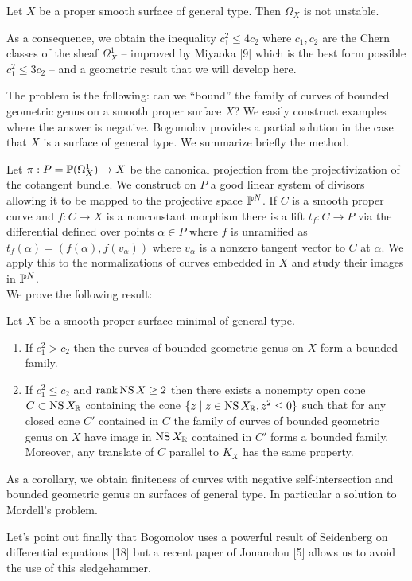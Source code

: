 \documentclass[main.tex]{subfiles}
\begin{document}
\begin{theorem}[0.3]
Let $X$ be a proper smooth surface of general type. Then $\Omega_X$ is not unstable.
\end{theorem}

As a consequence, we obtain the inequality $c_1^2 \le 4 c_2$ where $c_1, c_2$ are the Chern classes of the sheaf $\Omega_X^1$ -- improved by Miyaoka [9] which is the best form possible $c_1^2 \le 3 c_2$ -- and a geometric result that we will develop here.
\par
The problem is the following: can we ``bound'' the family of curves of bounded geometric genus on a smooth proper surface $X$? We easily construct examples where the answer is negative. Bogomolov provides a partial solution in the case that $X$ is a surface of general type. We summarize briefly the method.
\par
Let $\pi : P = \P(\Omega_X^1) \to X$ be the canonical projection from the projectivization of the cotangent bundle. We construct on $P$ a good linear system of divisors allowing it to be mapped to the projective space $\P^N$. If $C$ is a smooth proper curve and $f: C \to X$ is a nonconstant morphism there is a lift $t_f : C \to P$ via the differential defined over points $\alpha \in P$ where $f$ is unramified as $t_f(\alpha) = (f(\alpha), f(v_\alpha))$ where $v_\alpha$ is a nonzero tangent vector to $C$ at $\alpha$. We apply this to the normalizations of curves embedded in $X$ and study their images in $\P^N$.
\bigskip\\
We prove the following result:

\begin{theorem}
Let $X$ be a smooth proper surface minimal of general type.
\begin{enumerate}
\item If $c_1^2 > c_2$ then the curves of bounded geometric genus on $X$ form a bounded family.
\item If $c_1^2 \le c_2$ and $\rank \NS{X} \ge 2$ then there exists a nonempty open cone $C \subset \NS{X}_{\RR}$ containing the cone $\{ z \mid z \in \NS{X}_{\RR} , z^2 \le 0 \}$ such that for any closed cone $C'$ contained in $C$ the family of curves of bounded geometric genus on $X$ have image in $\NS{X}_{\RR}$ contained in $C'$ forms a bounded family. Moreover, any translate of $C$ parallel to $K_X$ has the same property.
\end{enumerate}
\end{theorem}

As a corollary, we obtain finiteness of curves with negative self-intersection and bounded geometric genus on surfaces of general type. In particular a solution to Mordell's problem.
\par
Let's point out finally that Bogomolov uses a powerful result of Seidenberg on differential equations [18] but a recent paper of Jouanolou [5] allows us to avoid the use of this sledgehammer.
\end{document}
